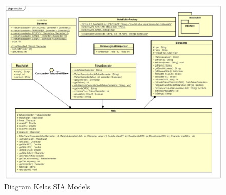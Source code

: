 \begin{figure}[H]
	\centering
	\includegraphics[scale=0.35]{Gambar/siamodels-class}
	\caption{Diagram Kelas SIA Models} 
	\label{fig:2_siamodels_class}
\end{figure}

